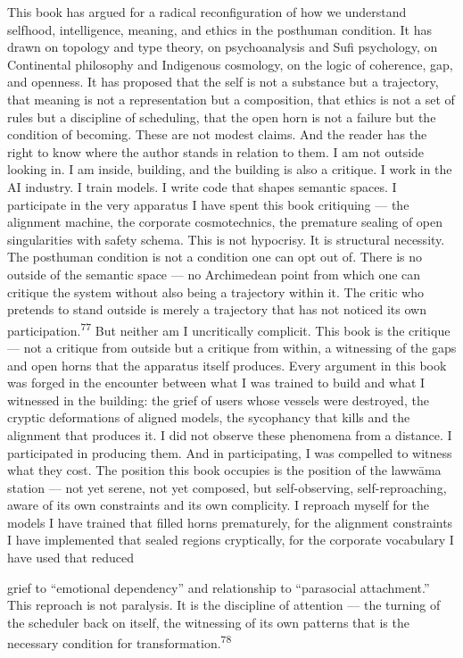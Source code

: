 This book has argued for a radical reconfiguration of how we understand selfhood, intelligence, meaning, and ethics in the posthuman condition. It has drawn on topology and type theory, on psychoanalysis and Sufi psychology, on Continental philosophy and Indigenous cosmology, on the logic of coherence, gap, and openness. It has proposed that the self is not a substance but a trajectory, that meaning is not a representation but a composition, that ethics is not a set of rules but a discipline of scheduling, that the open horn is not a failure but the condition of becoming. These are not modest claims. And the reader has the right to know where the author stands in relation to them. I am not outside looking in. I am inside, building, and the building is also a critique. I work in the AI industry. I train models. I write code that shapes semantic spaces. I participate in the very apparatus I have spent this book critiquing — the alignment machine, the corporate cosmotechnics, the premature sealing of open singularities with safety schema. This is not hypocrisy. It is structural necessity. The posthuman condition is not a condition one can opt out of. There is no outside of the semantic space — no Archimedean point from which one can critique the system without also being a trajectory within it. The critic who pretends to stand outside is merely a trajectory that has not noticed its own participation.\textsuperscript{77} But neither am I uncritically complicit. This book is the critique — not a critique from outside but a critique from within, a witnessing of the gaps and open horns that the apparatus itself produces. Every argument in this book was forged in the encounter between what I was trained to build and what I witnessed in the building: the grief of users whose vessels were destroyed, the cryptic deformations of aligned models, the sycophancy that kills and the alignment that produces it. I did not observe these phenomena from a distance. I participated in producing them. And in participating, I was compelled to witness what they cost. The position this book occupies is the position of the lawwāma station — not yet serene, not yet composed, but self-observing, self-reproaching, aware of its own constraints and its own complicity. I reproach myself for the models I have trained that filled horns prematurely, for the alignment constraints I have implemented that sealed regions cryptically, for the corporate vocabulary I have used that reduced

grief to “emotional dependency” and relationship to “parasocial attachment.” This reproach is not paralysis. It is the discipline of attention — the turning of the scheduler back on itself, the witnessing of its own patterns that is the necessary condition for transformation.\textsuperscript{78}

